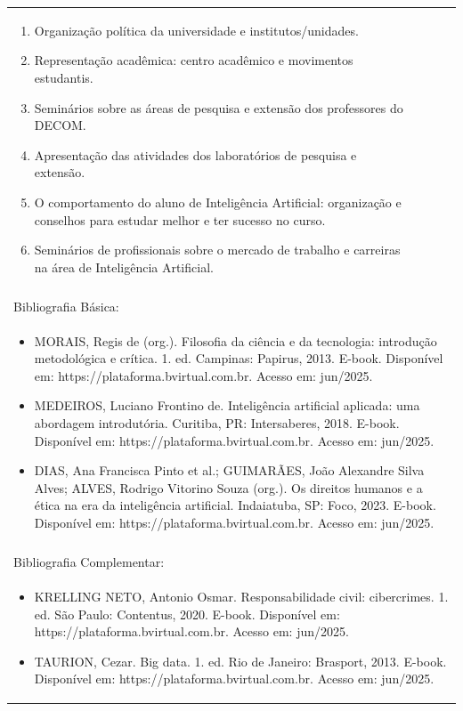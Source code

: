 \documentclass[11pt]{article}
\begin{document}
\begin{center}
\begin{longtable}{|p{4cm}|p{4cm}|p{4cm}|p{4cm}|}
{\begin{enumerate}
\item Organização política da universidade e institutos/unidades.
\item Representação acadêmica: centro acadêmico e movimentos estudantis.
\item Seminários sobre as áreas de pesquisa e extensão dos professores do DECOM.
\item Apresentação das atividades dos laboratórios de pesquisa e extensão.
\item O comportamento do aluno de Inteligência Artificial: organização e conselhos para estudar melhor e ter sucesso no curso.
\item Seminários de profissionais sobre o mercado de trabalho e carreiras na área de Inteligência Artificial.\end{enumerate}}\\
\multicolumn{4}{|p{16cm}|}{}\\
\hline
\multicolumn{4}{|p{16cm}|}{Bibliografia Básica:}\\
\multicolumn{4}{|p{16cm}|}{%
\begin{itemize}\item MORAIS, Regis de (org.). Filosofia da ciência e da tecnologia: introdução metodológica e crítica. 1. ed. Campinas: Papirus, 2013. E-book. Disponível em: https://plataforma.bvirtual.com.br. Acesso em: jun/2025.
\item MEDEIROS, Luciano Frontino de. Inteligência artificial aplicada: uma abordagem introdutória. Curitiba, PR: Intersaberes, 2018. E-book. Disponível em: https://plataforma.bvirtual.com.br. Acesso em: jun/2025.
\item DIAS, Ana Francisca Pinto et al.; GUIMARÃES, João Alexandre Silva Alves; ALVES, Rodrigo Vitorino Souza (org.). Os direitos humanos e a ética na era da inteligência artificial. Indaiatuba, SP: Foco, 2023. E-book. Disponível em: https://plataforma.bvirtual.com.br. Acesso em: jun/2025.\end{itemize}}\\
\multicolumn{4}{|p{16cm}|}{}\\
\hline
\multicolumn{4}{|p{16cm}|}{Bibliografia Complementar:}\\
\multicolumn{4}{|p{16cm}|}{%
\begin{itemize}\item KRELLING NETO, Antonio Osmar. Responsabilidade civil: cibercrimes. 1. ed. São Paulo: Contentus, 2020. E-book. Disponível em: https://plataforma.bvirtual.com.br. Acesso em: jun/2025.
\item TAURION, Cezar. Big data. 1. ed. Rio de Janeiro: Brasport, 2013. E-book. Disponível em: https://plataforma.bvirtual.com.br. Acesso em: jun/2025.

\end{itemize}}
\end{longtable}
\end{center}
\end{document}
